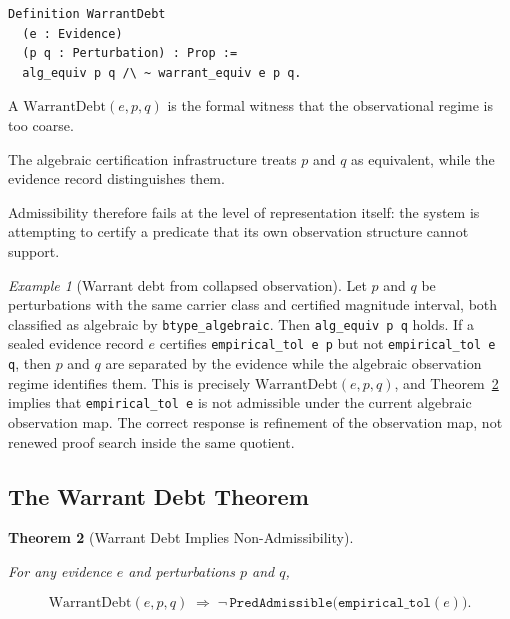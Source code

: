 \documentclass[pdflatex,sn-mathphys-num]{sn-jnl}
\theoremstyle{plain}
\newtheorem{theorem}{Theorem}[section]
\theoremstyle{definition}
\theoremstyle{remark}
\newtheorem{example}[theorem]{Example}
\newcommand{\WD}{\mathrm{WarrantDebt}}
\begin{document}
\begin{lstlisting}[style=rocq,
caption={Warrant debt.}]
Definition WarrantDebt
  (e : Evidence)
  (p q : Perturbation) : Prop :=
  alg_equiv p q /\ ~ warrant_equiv e p q.
\end{lstlisting}

A $\WD(e,p,q)$ is the formal witness that the observational regime is
too coarse.

The algebraic certification infrastructure treats $p$ and $q$ as
equivalent, while the evidence record distinguishes them.

Admissibility therefore fails at the level of representation itself:
the system is attempting to certify a predicate that its own
observation structure cannot support.

\begin{example}[Warrant debt from collapsed observation]
Let $p$ and $q$ be perturbations with the same carrier class and
certified magnitude interval, both classified as algebraic by
\texttt{btype\_algebraic}.
Then \texttt{alg\_equiv p q} holds.
If a sealed evidence record $e$ certifies \texttt{empirical\_tol e p}
but not \texttt{empirical\_tol e q}, then $p$ and $q$ are separated by
the evidence while the algebraic observation regime identifies them.
This is precisely $\WD(e,p,q)$, and Theorem~\ref{thm:wdt} implies that
\texttt{empirical\_tol e} is not admissible under the current algebraic
observation map.
The correct response is refinement of the observation map, not renewed
proof search inside the same quotient.
\end{example}

\subsection{The Warrant Debt Theorem}
\label{subsec:wdt}

\begin{theorem}[Warrant Debt Implies Non-Admissibility]
\label{thm:wdt}

For any evidence $e$ and perturbations $p$ and $q$,

\[
\WD(e,p,q)
\;\Rightarrow\;
\neg\,
\mathtt{PredAdmissible}
\bigl(
\mathtt{empirical\_tol}(e)
\bigr).
\]

\end{theorem}
\end{document}
